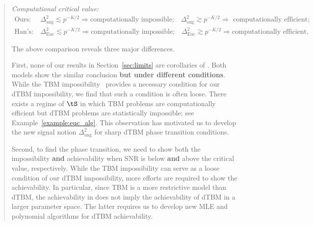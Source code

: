 \documentclass[11pt]{article}
\theoremstyle{definition}
\theoremstyle{definition}
\begin{document}
\begin{enumerate}[wide, labelwidth=!, labelindent=0pt]
\begin{quote}
\begin{itemize}[wide]
     \textit{Computational critical value:}
    \begin{align}
        \text{Ours:}& \ \Delta_{\text{ang}}^2 \lesssim p^{-K/2} \Rightarrow \text{computationally impossible;} \quad \Delta_{\text{ang}}^2 \gtrsim   p^{-K/2} \Rightarrow \text{ computationally efficient;} \\
        \text{Han's:}& \ \Delta_{\text{Euc}}^2 \lesssim p^{-K/2} \Rightarrow \text{computationally impossible;} \quad \Delta_{\text{Euc}}^2 \gtrsim   p^{-K/2} \Rightarrow \text{computationally efficient}.
    \end{align}
    
The above comparison reveals three major differences. 

First, none of our results in Section~\ref{sec:limits} are corollaries of \cite{han2020exact}. Both models show the similar conclusion {\bf but under different conditions}. While the TBM impossibility~\citep{han2020exact} provides a necessary condition for our dTBM impossibility, we find that such a condition is often loose. There exists a regime of $\tS$ in which TBM problems are computationally efficient but dTBM problems are statistically impossible; see Example~\ref{example:euc_alg}. This observation has motivated us to develop the new signal notion $\Delta^2_{\text{ang}}$ for sharp dTBM phase transition conditions.  
     
 Second, to find the phase transition, we need to show both the impossibility {\bf and} achievability when SNR is below {\bf and} above the critical value, respectively. While the TBM impossibility can serve as a loose condition of our dTBM impossibility, more efforts are required to show the achievability. In particular, since TBM is a more restrictive model than dTBM, the achievability in \cite{han2020exact} does not imply the achievability of dTBM in a larger parameter space. The latter requires us to develop new MLE and polynomial algorithms for dTBM achievability.  %
    

\end{itemize}
\end{quote}
\end{enumerate}
\end{document}
